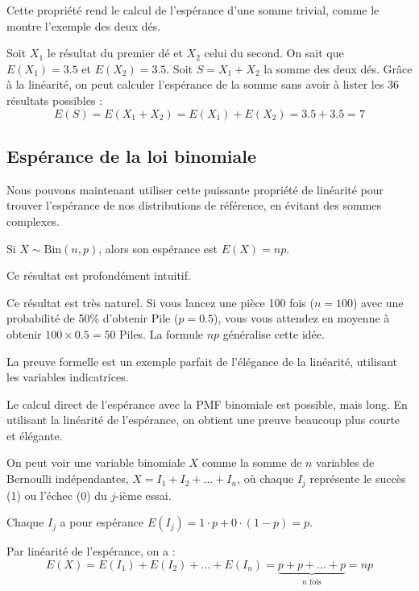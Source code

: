 Cette propriété rend le calcul de l'espérance d'une somme trivial, comme le montre l'exemple des deux dés.

\begin{examplebox}
Soit $X_1$ le résultat du premier dé et $X_2$ celui du second. On sait que $E(X_1) = 3.5$ et $E(X_2) = 3.5$.
Soit $S = X_1 + X_2$ la somme des deux dés. Grâce à la linéarité, on peut calculer l'espérance de la somme sans avoir à lister les 36 résultats possibles :
$$ E(S) = E(X_1 + X_2) = E(X_1) + E(X_2) = 3.5 + 3.5 = 7 $$
\end{examplebox}

\subsection{Espérance de la loi binomiale}

Nous pouvons maintenant utiliser cette puissante propriété de linéarité pour trouver l'espérance de nos distributions de référence, en évitant des sommes complexes.

\begin{theorembox}
Si $X \sim \text{Bin}(n, p)$, alors son espérance est $E(X) = np$.
\end{theorembox}

Ce résultat est profondément intuitif.

\begin{intuitionbox}
Ce résultat est très naturel. Si vous lancez une pièce 100 fois ($n=100$) avec une probabilité de 50\% d'obtenir Pile ($p=0.5$), vous vous attendez en moyenne à obtenir $100 \times 0.5 = 50$ Piles. La formule $np$ généralise cette idée.
\end{intuitionbox}

La preuve formelle est un exemple parfait de l'élégance de la linéarité, utilisant les variables indicatrices.

\begin{proofbox}
Le calcul direct de l'espérance avec la PMF binomiale est possible, mais long. En utilisant la linéarité de l'espérance, on obtient une preuve beaucoup plus courte et élégante.

On peut voir une variable binomiale $X$ comme la somme de $n$ variables de Bernoulli indépendantes, $X = I_1 + I_2 + \dots + I_n$, où chaque $I_j$ représente le succès (1) ou l'échec (0) du $j$-ième essai.

Chaque $I_j$ a pour espérance $E(I_j) = 1 \cdot p + 0 \cdot (1-p) = p$.

Par linéarité de l'espérance, on a :
$$ E(X) = E(I_1) + E(I_2) + \dots + E(I_n) = \underbrace{p + p + \dots + p}_{n \text{ fois}} = np $$
\end{proofbox}

